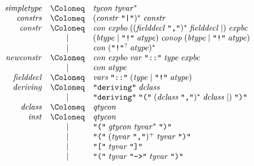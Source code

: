 \begin{align*}
  \begin{array}{rcl}
    \mathit{simpletype}
    & \Coloneq & \mathit{tycon}\; \mathit{tyvar}^* \\
    \mathit{constrs}
    & \Coloneq & (\mathit{constr}\; \text{\texttt{\textquotedbl|\textquotedbl}})^*\; \mathit{constr} \\
    \mathit{constr}
    & \Coloneq & \mathit{con}\; \mathit{expbo}\; ((\mathit{fielddecl}\; \text{\texttt{\textquotedbl,\textquotedbl}})^*\; \mathit{fielddecl} \mid )\; \mathit{expbc} \\
    & \mid & (\mathit{btype} \mid \text{\texttt{\textquotedbl!\textquotedbl}}\; \mathit{atype})\; \mathit{conop}\; (\mathit{btype} \mid \text{\texttt{\textquotedbl!\textquotedbl}}\; \mathit{atype}) \\
    & \mid & \mathit{con}\; (\text{\texttt{\textquotedbl!\textquotedbl}}^?\; \mathit{atype})^* \\
    \mathit{newconstr}
    & \Coloneq & \mathit{con}\; \mathit{expbo}\; \mathit{var}\; \text{\texttt{\textquotedbl ::\textquotedbl}}\; \mathit{type}\; \mathit{expbc} \\
    & \mid & \mathit{con}\; \mathit{atype} \\
    \mathit{fielddecl}
    & \Coloneq & \mathit{vars}\; \text{\texttt{\textquotedbl ::\textquotedbl}}\; (\mathit{type} \mid \text{\texttt{\textquotedbl !\textquotedbl}}\; \mathit{atype}) \\
    \mathit{deriving}
    & \Coloneq & \text{\texttt{\textquotedbl deriving\textquotedbl}}\; \mathit{dclass} \\
    & \mid & \text{\texttt{\textquotedbl deriving\textquotedbl}}\; \text{\texttt{\textquotedbl(\textquotedbl}}\; (\mathit{dclass}\; \text{\texttt{\textquotedbl,\textquotedbl}})^*\; \mathit{dclass} \mid )\; \text{\texttt{\textquotedbl)\textquotedbl}} \\
    \mathit{dclass}
    & \Coloneq & \mathit{qtycon} \\
    \mathit{inst}
    & \Coloneq & \mathit{qtycon} \\
    & \mid & \text{\texttt{\textquotedbl(\textquotedbl}}\; \mathit{gtycon}\; \mathit{tyvar}^*\; \text{\texttt{\textquotedbl)\textquotedbl}} \\
    & \mid & \text{\texttt{\textquotedbl(\textquotedbl}}\; (\mathit{tyvar}\; \text{\texttt{\textquotedbl,\textquotedbl}})^+\; \mathit{tyvar}\; \text{\texttt{\textquotedbl)\textquotedbl}} \\
    & \mid & \text{\texttt{\textquotedbl[\textquotedbl}}\; \mathit{tyvar}\; \text{\texttt{\textquotedbl]\textquotedbl}} \\
    & \mid & \text{\texttt{\textquotedbl(\textquotedbl}}\; \mathit{tyvar}\; \text{\texttt{\textquotedbl ->\textquotedbl}}\; \mathit{tyvar}\; \text{\texttt{\textquotedbl)\textquotedbl}}
  \end{array}
\end{align*}

